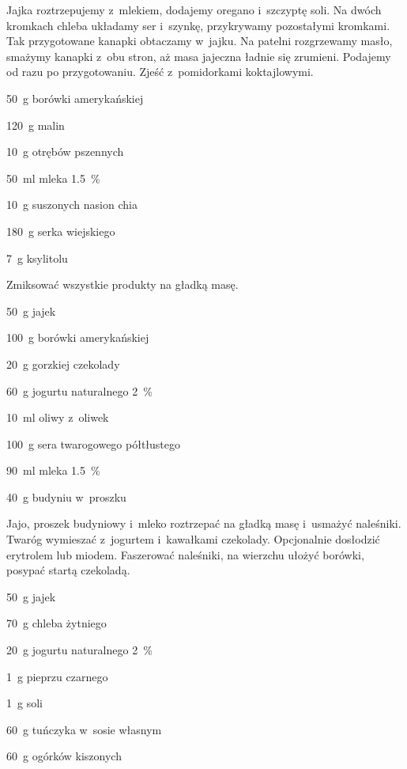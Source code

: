 \documentclass[../main.tex]{subfiles}
\begin{document}
Jajka roztrzepujemy z~mlekiem, dodajemy oregano i~szczyptę soli. Na dwóch
kromkach chleba układamy ser i~szynkę, przykrywamy pozostałymi kromkami. Tak
przygotowane kanapki obtaczamy w~jajku. Na patelni rozgrzewamy masło, smażymy
kanapki z~obu stron, aż masa jajeczna ładnie się zrumieni. Podajemy od razu po
przygotowaniu. Zjeść z~pomidorkami koktajlowymi.


\begin{Ingred}
    \item \qty{50}{\gram} borówki amerykańskiej
    \item \qty{120}{\gram} malin
    \item \qty{10}{\gram} otrębów pszennych
    \item \qty{50}{\milli\litre} mleka \qty{1.5}{\percent}
    \item \qty{10}{\gram} suszonych nasion chia
    \item \qty{180}{\gram} serka wiejskiego
    \item \qty{7}{\gram} ksylitolu
\end{Ingred}

Zmiksować wszystkie produkty na gładką masę.


\begin{Ingred}
    \item \qty{50}{\gram} jajek
    \item \qty{100}{\gram} borówki amerykańskiej
    \item \qty{20}{\gram} gorzkiej czekolady
    \item \qty{60}{\gram} jogurtu naturalnego \qty{2}{\percent}
    \item \qty{10}{\milli\litre} oliwy z~oliwek
    \item \qty{100}{\gram} sera twarogowego półtłustego
    \item \qty{90}{\milli\litre} mleka \qty{1.5}{\percent}
    \item \qty{40}{\gram} budyniu w~proszku
\end{Ingred}

Jajo, proszek budyniowy i~mleko roztrzepać na gładką masę i~usmażyć naleśniki.
Twaróg wymieszać z~jogurtem i~kawałkami czekolady. Opcjonalnie dosłodzić
erytrolem lub miodem. Faszerować naleśniki, na wierzchu ułożyć borówki, posypać
startą czekoladą.

\begin{Ingred}
    \item \qty{50}{\gram} jajek
    \item \qty{70}{\gram} chleba żytniego
    \item \qty{20}{\gram} jogurtu naturalnego \qty{2}{\percent}
    \item \qty{1}{\gram} pieprzu czarnego
    \item \qty{1}{\gram} soli
    \item \qty{60}{\gram} tuńczyka w~sosie własnym
    \item \qty{60}{\gram} ogórków kiszonych
\end{Ingred}
\end{document}
